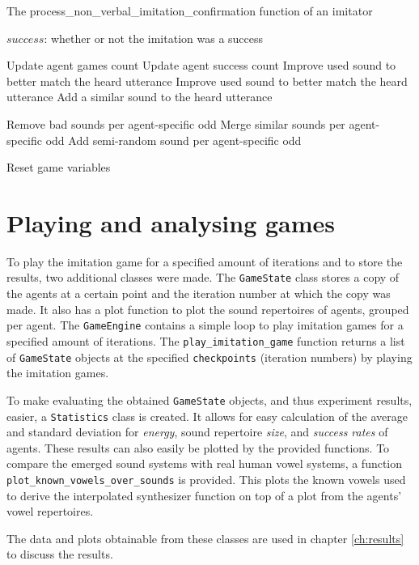 \begin{algorithm}[hbt!]
\caption{The process\_non\_verbal\_imitation\_confirmation function of an imitator}\label{alg:non_verbal}
\begin{algorithmic}
\Require $success$: whether or not the imitation was a success


\State Update agent games count
    \State Update agent success count
    \State Improve used sound to better match the heard utterance
    \State Improve used sound to better match the heard utterance
\Else
    \State Add a similar sound to the heard utterance
\EndIf

\State Remove bad sounds per agent-specific odd
\State Merge similar sounds per agent-specific odd
\State Add semi-random sound per agent-specific odd

\State Reset game variables

\end{algorithmic}
\end{algorithm}

\section{Playing and analysing games}
\label{sec:reimplementing_game_engine}

To play the imitation game for a specified amount of iterations and to store the results, two additional classes were made.
The \texttt{GameState} class stores a copy of the agents at a certain point and the iteration number at which the copy was made.
It also has a plot function to plot the sound repertoires of agents, grouped per agent.
The \texttt{GameEngine} contains a simple loop to play imitation games for a specified amount of iterations.
The \texttt{play\_imitation\_game} function returns a list of \texttt{GameState} objects at the specified \texttt{checkpoints} (iteration numbers) by playing the imitation games.

To make evaluating the obtained \texttt{GameState} objects, and thus experiment results, easier, a \texttt{Statistics} class is created.
It allows for easy calculation of the average and standard deviation for \textit{energy}, sound repertoire \textit{size}, and \textit{success rates} of agents.
These results can also easily be plotted by the provided functions.
To compare the emerged sound systems with real human vowel systems, a function \texttt{plot\_known\_vowels\_over\_sounds} is provided.
This plots the known vowels used to derive the interpolated synthesizer function on top of a plot from the agents' vowel repertoires.

The data and plots obtainable from these classes are used in chapter \ref{ch:results} to discuss the results.